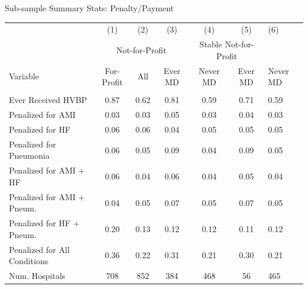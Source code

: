 \documentclass[notes,11pt, aspectratio=169]{beamer}
\begin{document}
\begin{frame}[noframenumbering]{Sub-sample Summary Stats: Penalty/Payment}
    \begin{table}[ht!]
    \footnotesize
\centering
\begin{tabular}[t]{lcccccl}
\toprule
 & (1) & (2) & (3) & (4) & (5) & (6)\\
\addlinespace[0.3em]
\multicolumn{2}{c}{ } & \multicolumn{3}{c}{Not-for-Profit} & \multicolumn{2}{c}{Stable Not-for-Profit} \\
\cmidrule(l{3pt}r{3pt}){3-5} \cmidrule(l{3pt}r{3pt}){6-7}
Variable & For-Profit & All & Ever MD & Never MD & Ever MD & Never MD\\
\midrule
\addlinespace[0.3em]
\multicolumn{7}{l}{\textbf{Penalty/Payment Variables}}\\
\hspace{1em}Ever Received HVBP & 0.87 & 0.62 & 0.81 & 0.59 & 0.71 & 0.59\\
\hspace{1em}Penalized for AMI & 0.03 & 0.03 & 0.05 & 0.03 & 0.04 & 0.03\\
\hspace{1em}Penalized for HF & 0.06 & 0.06 & 0.04 & 0.05 & 0.05 & 0.05\\
\hspace{1em}Penalized for Pneumonia & 0.06 & 0.05 & 0.09 & 0.04 & 0.09 & 0.05\\
\hspace{1em}Penalized for AMI + HF & 0.06 & 0.04 & 0.06 & 0.04 & 0.05 & 0.04\\
\hspace{1em}Penalized for AMI + Pneum. & 0.04 & 0.05 & 0.07 & 0.05 & 0.07 & 0.05\\
\hspace{1em}Penalized for HF + Pneum. & 0.20 & 0.13 & 0.12 & 0.12 & 0.11 & 0.12\\
\hspace{1em}Penalized for All Conditions & 0.36 & 0.22 & 0.31 & 0.21 & 0.30 & 0.21\\
\addlinespace[0.3em]
Num. Hospitals & 708 & 852 & 384 & 468 & 56 & 465\\
\bottomrule
\end{tabular}
\end{table}
\end{frame}
\end{document}

